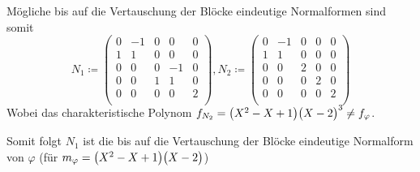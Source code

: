 \documentclass{scrreprt}
\begin{document}
\begin{itemize}
  Mögliche bis auf die Vertauschung der Blöcke eindeutige Normalformen sind somit
  \[
    N_1 \coloneqq \begin{pmatrix}
      0 & -1 &  0 &  0 & 0 \\
      1 & 1  &  0 &  0 & 0 \\
      0 & 0  &  0 & -1 & 0 \\
      0 & 0  &  1 &  1 & 0 \\
      0 & 0  &  0 &  0 & 2 \\
    \end{pmatrix}, N_2 \coloneqq \begin{pmatrix}
      0 & -1 & 0 & 0 & 0 \\
      1 &  1 & 0 & 0 & 0 \\
      0 &  0 & 2 & 0 & 0 \\
      0 &  0 & 0 & 2 & 0 \\
      0 &  0 & 0 & 0 & 2 \\
    \end{pmatrix}
  \]
  Wobei das charakteristische Polynom
  $f_{N_2} = \qty\big(X^2 - X + 1)\qty\big(X - 2)^3 \ne f_{\varphi}$.

  Somit folgt $N_1$ ist die bis auf die Vertauschung der Blöcke eindeutige
  Normalform von $\varphi$
  (für $m_{\varphi} = \qty\big(X^2 - X + 1)\qty\big(X - 2)$)
\end{itemize}

\newpage
\end{document}
